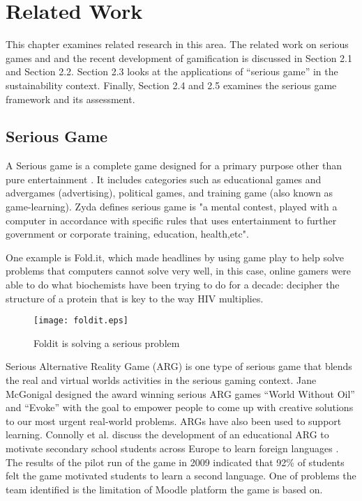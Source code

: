 \chapter{Related Work}
\label{cha:related-work}

This chapter examines related research in this area. The related work on serious games and and the recent development of gamification is discussed in Section 2.1 and Section 2.2. Section 2.3 looks at the applications of ``serious game'' in the sustainability context. Finally, Section 2.4 and 2.5 examines the serious game framework and its assessment.

\section {Serious Game}
A Serious game is a complete game designed for a primary purpose other than pure entertainment \cite {WikipediaSeriousGame}. It includes categories such as educational games and advergames (advertising), political games, and training game (also known as game-learning). Zyda \cite{Zyda2005} defines serious game is "a mental contest, played with a computer in accordance with specific rules that uses entertainment to further government or corporate training, education, health,etc".

One example is Fold.it, which made headlines \cite {khatib2011crystal} by using game play to help solve problems that computers cannot solve very well, in this case, online gamers were able to do what biochemists have been trying to do for a decade: decipher the structure of a protein that is key to the way HIV multiplies.

\begin{figure}[htbp]
	\centering
		\texttt{[image: foldit.eps]}
		\caption{Foldit is solving a serious problem}
		\label{fig:foldit}
\end{figure}

Serious Alternative Reality Game (ARG) is one type of serious game that blends the real and virtual worlds activities in the serious gaming context.
Jane McGonigal designed the award winning serious ARG games 
``World Without Oil'' \cite{worldwithoutoil} and ``Evoke''
\cite{urgentevoke} with the goal to empower people to come up with creative
solutions to our most urgent real-world problems. ARGs have also been used to
support learning. Connolly et al. discuss the development of an educational ARG
to motivate secondary school students across Europe to learn foreign languages
\cite{connolly2009arguing}. The results of the pilot run of the game in 2009
indicated that 92\% of students felt the game motivated students to learn a
second language. One of problems the team identified is the limitation of
Moodle platform the game is based on.

